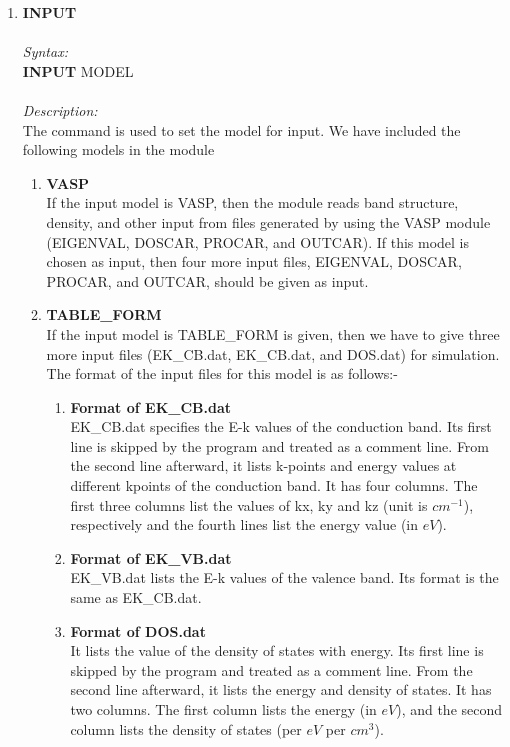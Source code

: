 \documentclass[12pt]{article}
\begin{document}
\begin{enumerate}
    \item \textbf{INPUT}   \\ \\
    \textit{Syntax:} \\
    \textbf{INPUT} MODEL \\ \\
    \textit{Description:} \\
    The command is used to set the model for input. We have included the following models in the module \\
    \begin{enumerate}
        \item \textbf{VASP} \\
        If the input model is VASP, then the module reads band structure, density, and other input from files generated by using the VASP module (EIGENVAL, DOSCAR, PROCAR, and OUTCAR). If this model is chosen as input, then four more input files, EIGENVAL, DOSCAR, PROCAR, and OUTCAR, should be given as input. \\
        \item \textbf{TABLE\_FORM} \\
        If the input model is TABLE\_FORM is given, then we have to give three more input files (EK\_CB.dat, EK\_CB.dat, and DOS.dat) for simulation. The format of the input files for this model is as follows:-
        \begin{enumerate}
            \item \textbf{Format of EK\_CB.dat} \\
            EK\_CB.dat specifies the E-k values of the conduction band. Its first line is skipped by the program and treated as a comment line. From the second line afterward, it lists k-points and energy values at different kpoints of the conduction band. It has four columns. The first three columns list the values of kx, ky and kz (unit is $cm^{-1}$), respectively and the fourth lines list the energy value (in $eV$).  \\
            \item \textbf{Format of EK\_VB.dat} \\
            EK\_VB.dat lists the E-k values of the valence band. Its format is the same as EK\_CB.dat. \\
            \item \textbf{Format of DOS.dat} \\
            It lists the value of the density of states with energy. Its first line is skipped by the program and treated as a comment line. From the second line afterward, it lists the energy and density of states. It has two columns. The first column lists the energy (in $eV$), and the second column lists the density of states (per $eV$ per $cm^3$). 
        \end{enumerate}
          

\end{enumerate}
\end{enumerate}
\end{document}
